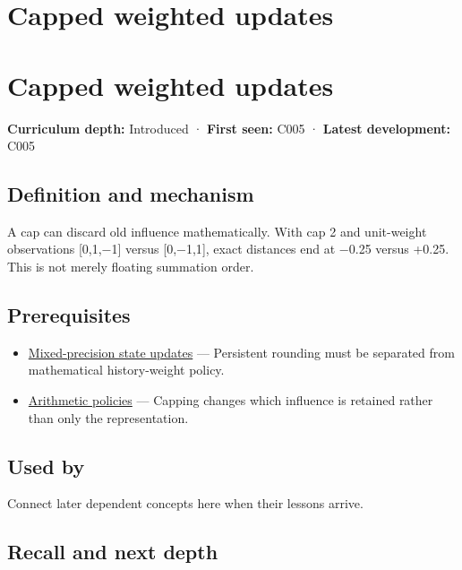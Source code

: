 \hypertarget{appendix-1e45d0613db3}{}
\section*{Capped weighted updates}
\section{Capped weighted updates}\label{appendix-1e45d0613db3-capped-weighted-updates}

\textbf{Curriculum depth:} Introduced · \textbf{First seen:} C005 · \textbf{Latest development:} C005

\subsection{Definition and mechanism}\label{appendix-1e45d0613db3-definition-and-mechanism}

A cap can discard old influence mathematically. With cap 2 and unit-weight observations {[}0,1,−1{]} versus {[}0,−1,1{]}, exact distances end at −0.25 versus +0.25. This is not merely floating summation order.

\subsection{Prerequisites}\label{appendix-1e45d0613db3-prerequisites}

\begin{itemize}
\tightlist
\item
  \hyperref[appendix-260182e617b7]{Mixed-precision state updates} --- Persistent rounding must be separated from mathematical history-weight policy.
\item
  \hyperref[appendix-2ed044358b82]{Arithmetic policies} --- Capping changes which influence is retained rather than only the representation.
\end{itemize}

\subsection{Used by}\label{appendix-1e45d0613db3-used-by}

Connect later dependent concepts here when their lessons arrive.

\subsection{Recall and next depth}\label{appendix-1e45d0613db3-recall-and-next-depth}


